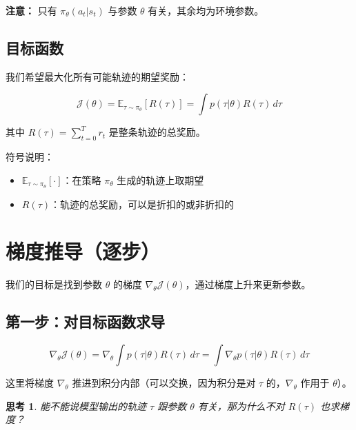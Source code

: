 \documentclass[12pt,a4paper]{article}
\newcommand{\E}{\mathbb{E}}
\newcommand{\grad}{\nabla}
\theoremstyle{noteplain}
\theoremstyle{noteexercise}
\newtheorem{exercise}{思考}[section]
\begin{document}
\textbf{注意：} 只有 $\pi_\theta(a_t|s_t)$ 与参数 $\theta$ 有关，其余均为环境参数。

\subsection{目标函数}\label{ssec:obj}

我们希望最大化所有可能轨迹的期望奖励：

\begin{equation}\label{eq:obj}
  \mathcal{J}(\theta) = \E_{\tau\sim\pi_\theta}[R(\tau)] = \int p(\tau|\theta) R(\tau)\, d\tau
\end{equation}

其中 $R(\tau) = \sum_{t=0}^{T} r_t$ 是整条轨迹的总奖励。

符号说明：
\begin{itemize}
  \setlength{\itemsep}{0.2em}
  \item $\E_{\tau\sim\pi_\theta}[\cdot]$：在策略 $\pi_\theta$ 生成的轨迹上取期望
  \item $R(\tau)$：轨迹的总奖励，可以是折扣的或非折扣的
\end{itemize}

\section{梯度推导（逐步）}\label{sec:gradient-derive}

我们的目标是找到参数 $\theta$ 的梯度 $\grad_\theta \mathcal{J}(\theta)$，通过梯度上升来更新参数。

\subsection{第一步：对目标函数求导}\label{ssec:step1}

\begin{equation}\label{eq:grad-int}
  \grad_\theta \mathcal{J}(\theta)
  = \grad_\theta \int p(\tau|\theta) R(\tau)\, d\tau
  = \int \grad_\theta p(\tau|\theta) R(\tau)\, d\tau
\end{equation}

这里将梯度 $\grad_\theta$ 推进到积分内部（可以交换，因为积分是对 $\tau$ 的，$\grad_\theta$ 作用于 $\theta$）。

\begin{exercise}
  能不能说模型输出的轨迹 $\tau$ 跟参数 $\theta$ 有关，那为什么不对 $R(\tau)$ 也求梯度？
\end{exercise}
\end{document}
